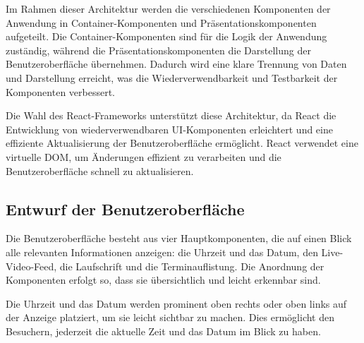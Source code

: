 Im Rahmen dieser Architektur werden die verschiedenen Komponenten der Anwendung in Container-Komponenten und Präsentationskomponenten aufgeteilt.
Die Container-Komponenten sind für die Logik der Anwendung zuständig, während die Präsentationskomponenten die Darstellung der Benutzeroberfläche übernehmen.
Dadurch wird eine klare Trennung von Daten und Darstellung erreicht, was die Wiederverwendbarkeit und Testbarkeit der Komponenten verbessert.


Die Wahl des React-Frameworks unterstützt diese Architektur, da React die Entwicklung von wiederverwendbaren \ac{UI}-Komponenten erleichtert und eine effiziente Aktualisierung der Benutzeroberfläche ermöglicht.
React verwendet eine virtuelle DOM, um Änderungen effizient zu verarbeiten und die Benutzeroberfläche schnell zu aktualisieren.

%


\subsection{Entwurf der Benutzeroberfläche}
\label{sec:Benutzeroberflaeche} 
Die Benutzeroberfläche besteht aus vier Hauptkomponenten, die auf einen Blick alle relevanten Informationen anzeigen: die Uhrzeit und das Datum, den Live-Video-Feed, die Laufschrift und die Terminauflistung.
Die Anordnung der Komponenten erfolgt so, dass sie übersichtlich und leicht erkennbar sind.

Die Uhrzeit und das Datum werden prominent oben rechts oder oben links auf der Anzeige platziert, um sie leicht sichtbar zu machen.
Dies ermöglicht den Besuchern, jederzeit die aktuelle Zeit und das Datum im Blick zu haben.

